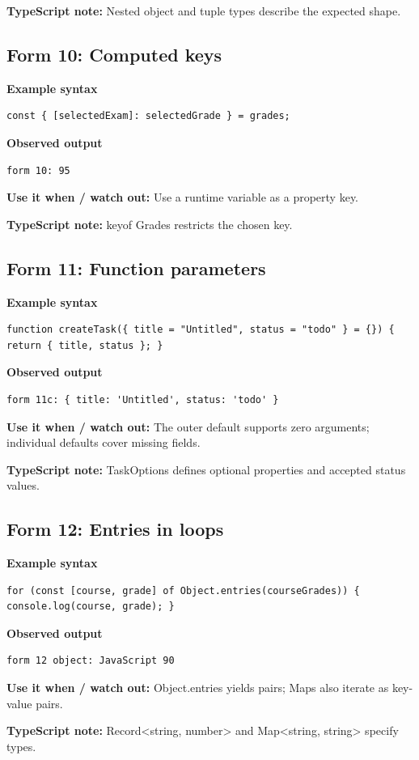 \documentclass[11pt,a4paper]{article}
\begin{document}
\textbf{TypeScript note:} Nested object and tuple types describe the expected shape.
\subsection{Form 10: Computed keys}
\textbf{Example syntax}
\begin{lstlisting}
const { [selectedExam]: selectedGrade } = grades;
\end{lstlisting}
\textbf{Observed output}
\begin{lstlisting}
form 10: 95
\end{lstlisting}
\textbf{Use it when / watch out:} Use a runtime variable as a property key.

\textbf{TypeScript note:} keyof Grades restricts the chosen key.
\subsection{Form 11: Function parameters}
\textbf{Example syntax}
\begin{lstlisting}
function createTask({ title = "Untitled", status = "todo" } = {}) { return { title, status }; }
\end{lstlisting}
\textbf{Observed output}
\begin{lstlisting}
form 11c: { title: 'Untitled', status: 'todo' }
\end{lstlisting}
\textbf{Use it when / watch out:} The outer default supports zero arguments; individual defaults cover missing fields.

\textbf{TypeScript note:} TaskOptions defines optional properties and accepted status values.
\subsection{Form 12: Entries in loops}
\textbf{Example syntax}
\begin{lstlisting}
for (const [course, grade] of Object.entries(courseGrades)) { console.log(course, grade); }
\end{lstlisting}
\textbf{Observed output}
\begin{lstlisting}
form 12 object: JavaScript 90
\end{lstlisting}
\textbf{Use it when / watch out:} Object.entries yields pairs; Maps also iterate as key-value pairs.

\textbf{TypeScript note:} Record<string, number> and Map<string, string> specify types.
\end{document}
